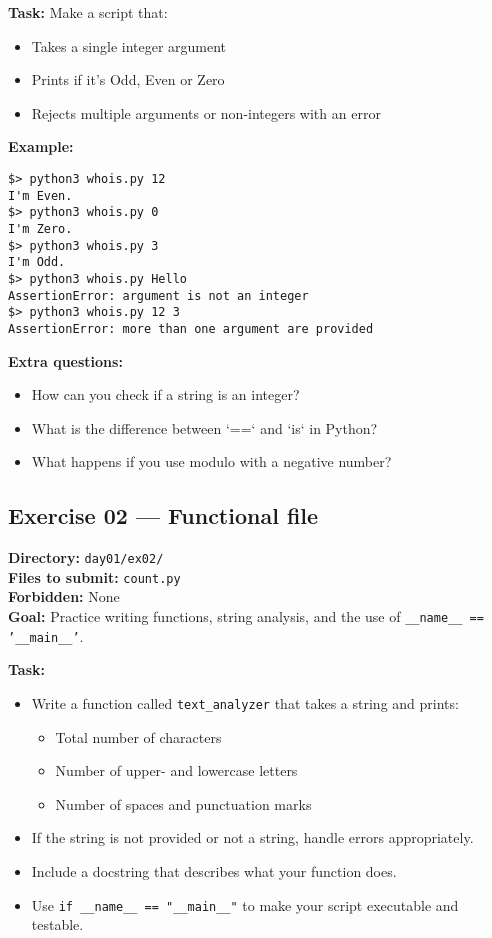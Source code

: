 \documentclass[12pt,a4paper]{article}
\begin{document}
\textbf{Task:} Make a script that:
\begin{itemize}
  \item Takes a single integer argument
  \item Prints if it's Odd, Even or Zero
  \item Rejects multiple arguments or non-integers with an error
\end{itemize}

\textbf{Example:}
\begin{lstlisting}
$> python3 whois.py 12
I'm Even.
$> python3 whois.py 0
I'm Zero.
$> python3 whois.py 3
I'm Odd.
$> python3 whois.py Hello
AssertionError: argument is not an integer
$> python3 whois.py 12 3
AssertionError: more than one argument are provided
\end{lstlisting}

\textbf{Extra questions:}
\begin{itemize}
  \item How can you check if a string is an integer?
  \item What is the difference between `==` and `is` in Python?
  \item What happens if you use modulo with a negative number?
\end{itemize}

\newpage
\subsection*{Exercise 02 — Functional file}
\textbf{Directory:} \texttt{day01/ex02/}\\
\textbf{Files to submit:} \texttt{count.py}\\
\textbf{Forbidden:} None\\
\textbf{Goal:} Practice writing functions, string analysis, and the use of \texttt{\_\_name\_\_ == '\_\_main\_\_'}.


\textbf{Task:}
\begin{itemize}
  \item Write a function called \texttt{text\_analyzer} that takes a string and prints:
  \begin{itemize}
    \item Total number of characters
    \item Number of upper- and lowercase letters
    \item Number of spaces and punctuation marks
  \end{itemize}
  \item If the string is not provided or not a string, handle errors appropriately.
  \item Include a docstring that describes what your function does.
  \item Use \texttt{if \_\_name\_\_ == "\_\_main\_\_"} to make your script executable and testable.
\end{itemize}
\end{document}
